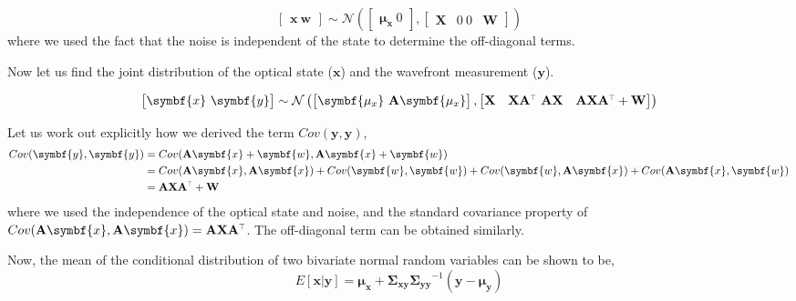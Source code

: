 \documentclass[SE,authoryear,toc]{lsstdoc}
\renewcommand{\v}[1]{\mathbf{#1}}
\newcommand{\tr}{\scalebox{0.6}{$\top$}}
\begin{document}
\begin{equation}
    \begin{bmatrix}
        \symbf{x} \
        \symbf{w}
    \end{bmatrix}
    \sim \mathcal{N} \left(
    \begin{bmatrix}
        \symbf{\mu_x} \
        0
    \end{bmatrix},
    \begin{bmatrix}
        \v{X} & 0 \
        0 & \v{W}
    \end{bmatrix}
    \right) 
\end{equation}
where we used the fact that the noise is independent of the state to determine the off-diagonal terms.

Now let us find the joint distribution of the optical state ($\symbf{x}$) and the wavefront measurement ($\symbf{y}$). 

\begin{equation}
    \begin{bmatrix}
        \symbf{x} \
        \symbf{y}
    \end{bmatrix}
    \sim \mathcal{N} \left(
    \begin{bmatrix}
        \symbf{\mu_x} \
        \v{A}\symbf{\mu_x}
    \end{bmatrix},
    \begin{bmatrix}
        \v{X} & \v{X}\v{A}^{\tr} \
        \v{A}\v{X} & \v{A}\v{X}\v{A}^{\tr} + \v{W}
    \end{bmatrix}
    \right) 
\end{equation}

Let us work out explicitly how we derived the term $Cov(\symbf{y}, \symbf{y})$,
\begin{equation}\label{eq14}
\begin{split}
    Cov(\symbf{y}, \symbf{y}) & = Cov(\v{A}\symbf{x} + \symbf{w}, \v{A}\symbf{x} + \symbf{w}) \\
    & = Cov(\v{A}\symbf{x}, \v{A}\symbf{x}) + Cov(\symbf{w}, \symbf{w}) + Cov(\symbf{w}, \v{A}\symbf{x}) + Cov(\v{A}\symbf{x}, \symbf{w}) \\ 
    &= \v{A}\v{X}\v{A}^{\tr} + \v{W}
\end{split}
\end{equation}
where we used the independence of the optical state and noise, and the standard covariance property of $Cov(\v{A}\symbf{x}, \v{A}\symbf{x}) = \v{A}\v{X}\v{A}^{\tr}$. The off-diagonal term can be obtained similarly. 

Now, the mean of the conditional distribution of two bivariate normal random variables can be shown to be, 
\begin{equation}
    E[\symbf{x} | \symbf{y}] = \symbf{\mu_x} + \v{\Sigma_{xy} } \v{\Sigma_{yy}}^{-1} (\symbf{y} - \symbf{\mu_y})
\end{equation}
\end{document}
